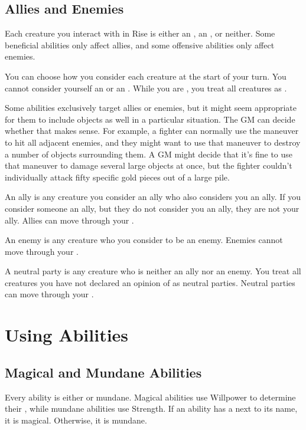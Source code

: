   \subsection{Allies and Enemies}\label{Allies and Enemies}
    Each creature you interact with in Rise is either an , an , or neither.
    Some beneficial abilities only affect allies, and some offensive abilities only affect enemies.

    You can choose how you consider each creature at the start of your turn.
    You cannot consider yourself an  or an .
    While you are \unconscious, you treat all creatures as .

    Some abilities exclusively target allies or enemies, but it might seem appropriate for them to include objects as well in a particular situation.
    The GM can decide whether that makes sense.
    For example, a fighter can normally use the  maneuver to hit all adjacent enemies, and they might want to use that maneuver to destroy a number of objects surrounding them.
    A GM might decide that it's fine to use that maneuver to damage several large objects at once, but the fighter couldn't individually attack fifty specific gold pieces out of a large pile.

     An ally is any creature you consider an ally who also considers you an ally.
    If you consider someone an ally, but they do not consider you an ally, they are not your ally.
    Allies can move through your .

     An enemy is any creature who you consider to be an enemy.
    Enemies cannot move through your .

     A neutral party is any creature who is neither an ally nor an enemy.
    You treat all creatures you have not declared an opinion of as neutral parties.
    Neutral parties can move through your .

\section{Using Abilities}\label{Using Abilities}

  \subsection{Magical and Mundane Abilities}\label{Magical and Mundane Abilities}
    Every ability is either \magical or mundane.
    Magical abilities use Willpower to determine their , while mundane abilities use Strength.
    If an ability has a \sparkle{} next to its name, it is magical.
    Otherwise, it is mundane.

